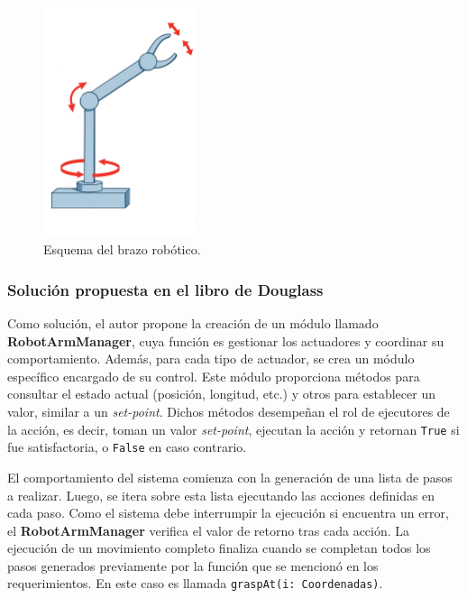 \begin{figure}[H]
\caption{Esquema del brazo robótico.}
\label{brazoEsquema}
\begin{centering}
{\includegraphics[width=0.4\textwidth]{brazo3.png}\par}
\end{centering}
\end{figure}

\subsubsection*{Solución propuesta en el libro de Douglass}

Como solución, el autor propone la creación de un módulo llamado \textbf{RobotArmManager}, cuya función es gestionar los actuadores y coordinar su comportamiento. Además, para cada tipo de actuador, se crea un módulo específico encargado de su control. Este módulo proporciona métodos para consultar el estado actual (posición, longitud, etc.) y otros para establecer un valor, similar a un \textit{set-point}. Dichos métodos desempeñan el rol de ejecutores de la acción, es decir, toman un valor \textit{set-point}, ejecutan la acción y retornan \verb|True| si fue satisfactoria, o \verb|False| en caso contrario.

El comportamiento del sistema comienza con la generación de una lista de pasos a realizar. Luego, se itera sobre esta lista ejecutando las acciones definidas en cada paso. Como el sistema debe interrumpir la ejecución si encuentra un error, el \textbf{RobotArmManager} verifica el valor de retorno tras cada acción. La ejecución de un movimiento completo finaliza cuando se completan todos los pasos generados previamente por la función que se mencionó en los requerimientos. En este caso es llamada \verb|graspAt(i: Coordenadas)|.

